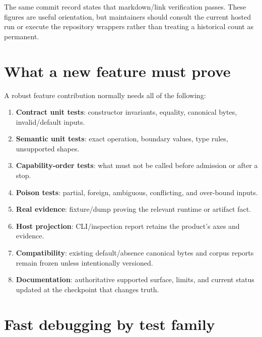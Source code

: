 \documentclass[11pt,oneside,openany]{book}
\begin{document}
The same commit record states that markdown/link verification passes. These figures are useful orientation, but maintainers should consult the current hosted run or execute the repository wrappers rather than treating a historical count as permanent.

\section{What a new feature must prove}

A robust feature contribution normally needs all of the following:

\begin{enumerate}
  \item \textbf{Contract unit tests}: constructor invariants, equality, canonical bytes, invalid/default inputs.
  \item \textbf{Semantic unit tests}: exact operation, boundary values, type rules, unsupported shapes.
  \item \textbf{Capability-order tests}: what must not be called before admission or after a stop.
  \item \textbf{Poison tests}: partial, foreign, ambiguous, conflicting, and over-bound inputs.
  \item \textbf{Real evidence}: fixture/dump proving the relevant runtime or artifact fact.
  \item \textbf{Host projection}: CLI/inspection report retains the product's axes and evidence.
  \item \textbf{Compatibility}: existing default/absence canonical bytes and corpus reports remain frozen unless intentionally versioned.
  \item \textbf{Documentation}: authoritative supported surface, limits, and current status updated at the checkpoint that changes truth.
\end{enumerate}

\section{Fast debugging by test family}
\end{document}
